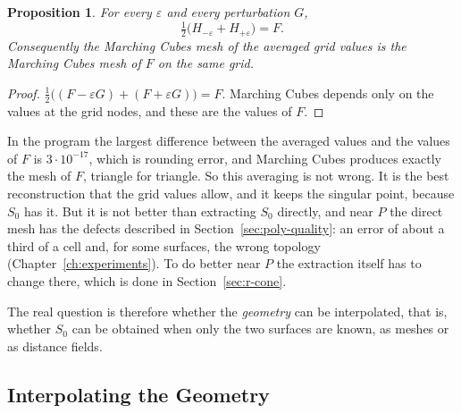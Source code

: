\documentclass[12pt, a4paper, oneside]{book}
\theoremstyle{plain}
\newtheorem{proposition}[theorem]{Proposition}
\theoremstyle{definition}
\theoremstyle{remark}
\theoremstyle{definition}
\begin{document}
\begin{proposition}
\label{prop:average}
For every $\varepsilon$ and every perturbation $G$,
\[
\tfrac12\big(H_{-\varepsilon}+H_{+\varepsilon}\big)=F .
\]
Consequently the Marching Cubes mesh of the averaged grid values is the Marching Cubes mesh of $F$ on the same grid.
\end{proposition}

\begin{proof}
$\frac12\big((F-\varepsilon G)+(F+\varepsilon G)\big)=F$. Marching Cubes depends only on the values at the grid nodes, and these are the values of $F$.
\end{proof}

In the program the largest difference between the averaged values and the values of $F$ is $3\cdot10^{-17}$, which is rounding error, and Marching Cubes produces exactly the mesh of $F$, triangle for triangle. So this averaging is not wrong. It is the best reconstruction that the grid values allow, and it keeps the singular point, because $S_0$ has it. But it is not better than extracting $S_0$ directly, and near $P$ the direct mesh has the defects described in Section~\ref{sec:poly-quality}: an error of about a third of a cell and, for some surfaces, the wrong topology (Chapter~\ref{ch:experiments}). To do better near $P$ the extraction itself has to change there, which is done in Section~\ref{sec:r-cone}.

The real question is therefore whether the \emph{geometry} can be interpolated, that is, whether $S_0$ can be obtained when only the two surfaces are known, as meshes or as distance fields.

\subsection{Interpolating the Geometry}
\label{sec:interp-variants}
\end{document}
